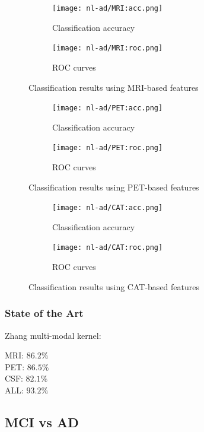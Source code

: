 \documentclass[12pt,a4paper]{article}
\begin{document}
\begin{figure}[H]
  \centering
  \begin{subfigure}[h]{0.49\textwidth}
    \texttt{[image: nl-ad/MRI:acc.png]}
    \caption{Classification accuracy}  
  \end{subfigure}
  \begin{subfigure}[h]{0.49\textwidth}
    \texttt{[image: nl-ad/MRI:roc.png]}
    \caption{ROC curves}  
  \end{subfigure}
  \caption{Classification results using MRI-based features}
\end{figure}

\begin{figure}[H]
  \centering
  \begin{subfigure}[h]{0.49\textwidth}
    \texttt{[image: nl-ad/PET:acc.png]}
    \caption{Classification accuracy}  
  \end{subfigure}
  \begin{subfigure}[h]{0.49\textwidth}
    \texttt{[image: nl-ad/PET:roc.png]}
    \caption{ROC curves}  
  \end{subfigure}
  \caption{Classification results using PET-based features}
\end{figure}

\begin{figure}[H]
  \centering
  \begin{subfigure}[h]{0.49\textwidth}
    \texttt{[image: nl-ad/CAT:acc.png]}
    \caption{Classification accuracy}  
  \end{subfigure}
  \begin{subfigure}[h]{0.49\textwidth}
    \texttt{[image: nl-ad/CAT:roc.png]}
    \caption{ROC curves}  
  \end{subfigure}
  \caption{Classification results using CAT-based features}
\end{figure}

\subsubsection{State of the Art}
\label{sec:nl-ad-soa}

Zhang multi-modal kernel:

MRI: $86.2\%$\\
PET: $86.5\%$\\
CSF: $82.1\%$\\
ALL: $93.2\%$\\

\subsection{MCI vs AD}
\label{sec:mci-ad}
\end{document}
